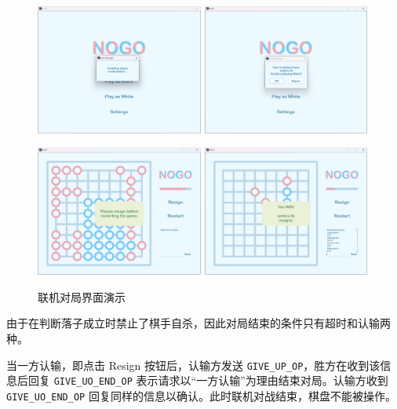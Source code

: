 \documentclass{noithesis}
\begin{document}
   \begin{figure}[!htb]
    	\centering
    	
    	\includegraphics[width=5.5cm]{img/web4.png}
    	\includegraphics[width=5.5cm]{img/web5.png}
    	
    	\includegraphics[width=5.5cm]{img/web2.png}
    	\includegraphics[width=5.5cm]{img/web3.png}
    	
    	\caption{联机对局界面演示}
    \end{figure}
    
    由于在判断落子成立时禁止了棋手自杀，因此对局结束的条件只有超时和认输两种。
    
    当一方认输，即点击 Resign 按钮后，认输方发送 \verb|GIVE_UP_OP|，胜方在收到该信息后回复 \verb|GIVE_UO_END_OP| 表示请求以“一方认输”为理由结束对局。认输方收到 \verb|GIVE_UO_END_OP| 回复同样的信息以确认。此时联机对战结束，棋盘不能被操作。
    
\end{document}
